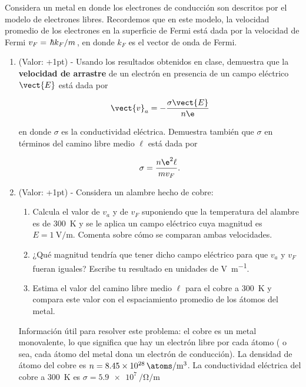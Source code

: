 \documentclass[./../main.tex]{subfiles}
\begin{document}
    \begin{exercisex}
        Considera un metal en donde los electrones de conducción son descritos por el modelo de electrones libres. Recordemos que en este modelo, la velocidad promedio de los electrones en la superficie de Fermi está dada por la velocidad de Fermi \(v_{F} = \slashfrac{\hbar k_{F}}{m}\), en donde \(k_{F}\) es el vector de onda de Fermi.

        \begin{enumerate}
            \item (Valor: +1pt) - Usando los resultados obtenidos en clase, demuestra que la \textbf{velocidad de arrastre} de un electrón en presencia de un campo eléctrico \(\vect{E}\) está dada por
            
            \begin{equation}
                \vect{v}_{a} = -\dfrac{\sigma\vect{E}}{n\e}
            \end{equation}

            en donde \(\sigma\) es la conductividad eléctrica. Demuestra también que \(\sigma\) en términos del camino libre medio \(\ell\) está dada por

            \begin{equation*}
                \sigma = \dfrac{n\e^{2}\ell}{mv_{F}}.
            \end{equation*}

            \item (Valor: +1pt) - Considera un alambre hecho de cobre:
                \begin{enumerate}[label = (b.\arabic*)]
                    \item Calcula el valor de \(v_{a}\) y de \(v_{F}\) suponiendo que la temperatura del alambre es de \qty{300}{\kelvin} y se le aplica un campo eléctrico cuya magnitud es \(E = \qty{1}{\V\per\m}\). Comenta sobre cómo se comparan ambas velocidades.
                    \item ¿Qué magnitud tendría que tener dicho campo eléctrico para que \(v_{a}\) y \(v_{F}\) fueran iguales? Escribe tu resultado en unidades de \unit{\V\per\m}.
                    \item Estima el valor del camino libre medio \(\ell\) para el cobre a \qty{300}{\kelvin} y compara este valor con el espaciamiento promedio de los átomos del metal.
                \end{enumerate}

                Información útil para resolver este problema: el cobre es un metal monovalente, lo que significa que hay un electrón libre por cada átomo ( o sea, cada átomo del metal dona un electrón de conducción). La densidad de átomo del cobre es \(n = \qty{8.45e28}{\atoms\per\m\cubed}\). La conductividad eléctrica del cobre a \qty{300}{\K} es \(\sigma = \qty[per-mode=power]{5.9e7}{\per\ohm\per\m}\)
        \end{enumerate}
    \end{exercisex}
\end{document}
